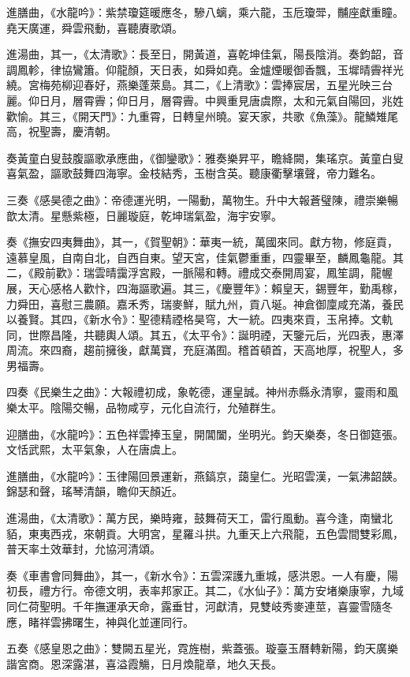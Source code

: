 進膳曲，《水龍吟》：紫禁瓊筵暖應冬，驂八螭，乘六龍，玉卮瓊斝，黼座獻重瞳。堯天廣運，舜雲飛動，喜聽賡歌頌。

進湯曲，其一，《太清歌》：長至日，開黃道，喜乾坤佳氣，陽長陰消。奏鈞韶，音調鳳軫，律協鸞簫。仰龍顏，天日表，如舜如堯。金爐煙暖御香飄，玉墀晴霽祥光繞。宮梅苑柳迎春好，燕樂蓬萊島。其二，《上清歌》：雲捧宸居，五星光映三台麗。仰日月，層霄霽；仰日月，層霄霽。中興重見唐虞際，太和元氣自陽回，兆姓歡愉。其三，《開天門》：九重霄，日轉皇州曉。宴天家，共歌《魚藻》。龍鱗雉尾高，祝聖壽，慶清朝。

奏黃童白叟鼓腹謳歌承應曲，《御鑾歌》：雅奏樂昇平，瞻絳闕，集瑤京。黃童白叟喜氣盈，謳歌鼓舞四海寧。金枝結秀，玉樹含英。聽康衢擊壤聲，帝力難名。

三奏《感昊德之曲》：帝德運光明，一陽動，萬物生。升中大報蒼璧陳，禮崇樂暢歆太清。星懸紫極，日麗璇庭，乾坤瑞氣盈，海宇安寧。

奏《撫安四夷舞曲》，其一，《賀聖朝》：華夷一統，萬國來同。獻方物，修庭貢，遠慕皇風，自南自北，自西自東。望天宮，佳氣鬱重重，四靈畢至，麟鳳龜龍。其二，《殿前歡》：瑞雲晴靄浮宮殿，一脈陽和轉。禮成交泰開周宴，鳳笙調，龍幄展，天心感格人歡忭，四海謳歌遍。其三，《慶豐年》：賴皇天，錫豐年，勤禹稼，力舜田，喜慰三農願。嘉禾秀，瑞麥鮮，賦九州，貢八埏。神倉御廩咸充滿，養民以養賢。其四，《新水令》：聖德精禋格昊穹，大一統。四夷來貢，玉帛捧。文軌同，世際昌隆，共聽輿人頌。其五，《太平令》：誕明禋，天鑒元后，光四表，惠澤周流。來四裔，趨前擁後，獻萬寶，充庭滿囿。稽首頓首，天高地厚，祝聖人，多男福壽。

四奏《民樂生之曲》：大報禮初成，象乾德，運皇誠。神州赤縣永清寧，靈雨和風樂太平。陰陽交暢，品物咸亨，元化自流行，允殖群生。

迎膳曲，《水龍吟》：五色祥雲捧玉皇，開閶闔，坐明光。鈞天樂奏，冬日御筵張。文恬武熙，太平氣象，人在唐虞上。

進膳曲，《水龍吟》：玉律陽回景運新，燕鎬京，藹皇仁。光昭雲漢，一氣沸韶韺。錦瑟和聲，瑤琴清韻，瞻仰天顏近。

進湯曲，《太清歌》：萬方民，樂時雍，鼓舞荷天工，雷行風動。喜今逢，南蠻北貊，東夷西戎，來朝貢。大明宮，星羅斗拱。九重天上六飛龍，五色雲間雙彩鳳，普天率土效華封，允協河清頌。

奏《車書會同舞曲》，其一，《新水令》：五雲深護九重城，感洪恩。一人有慶，陽初長，禮方行。帝德文明，表率邦家正。其二，《水仙子》：萬方安堵樂康寧，九域同仁荷聖明。千年撫運承天命，露垂甘，河獻清，見雙岐秀麥連莖，喜靈雪隨冬應，睹祥雲拂曙生，神與化並運同行。

五奏《感皇恩之曲》：雙闕五星光，霓旌樹，紫蓋張。璇臺玉曆轉新陽，鈞天廣樂諧宮商。恩深露湛，喜溢霞觴，日月煥龍章，地久天長。

